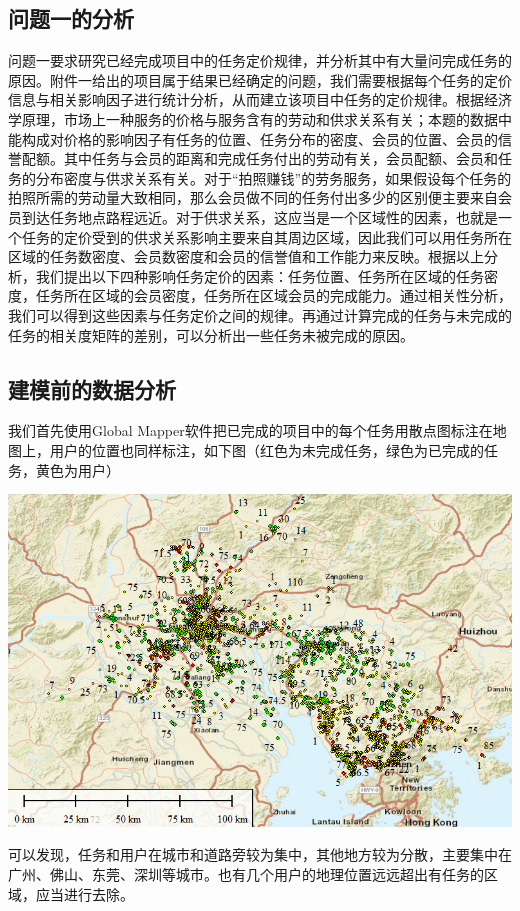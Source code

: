 \documentclass[withoutpreface,bwprint]{cumcmthesis} %
\begin{document}
\subsection{问题一的分析}
问题一要求研究已经完成项目中的任务定价规律，并分析其中有大量问完成任务的原因。附件一给出的项目属于结果已经确定的问题，我们需要根据每个任务的定价信息与相关影响因子进行统计分析，从而建立该项目中任务的定价规律。根据经济学原理，市场上一种服务的价格与服务含有的劳动和供求关系有关；本题的数据中能构成对价格的影响因子有任务的位置、任务分布的密度、会员的位置、会员的信誉配额。其中任务与会员的距离和完成任务付出的劳动有关，会员配额、会员和任务的分布密度与供求关系有关。对于“拍照赚钱”的劳务服务，如果假设每个任务的拍照所需的劳动量大致相同，那么会员做不同的任务付出多少的区别便主要来自会员到达任务地点路程远近。对于供求关系，这应当是一个区域性的因素，也就是一个任务的定价受到的供求关系影响主要来自其周边区域，因此我们可以用任务所在区域的任务数密度、会员数密度和会员的信誉值和工作能力来反映。根据以上分析，我们提出以下四种影响任务定价的因素：任务位置、任务所在区域的任务密度，任务所在区域的会员密度，任务所在区域会员的完成能力。通过相关性分析，我们可以得到这些因素与任务定价之间的规律。再通过计算完成的任务与未完成的任务的相关度矩阵的差别，可以分析出一些任务未被完成的原因。

\subsection{建模前的数据分析}
我们首先使用Global Mapper软件把已完成的项目中的每个任务用散点图标注在地图上，用户的位置也同样标注，如下图（红色为未完成任务，绿色为已完成的任务，黄色为用户）

\centerline{\includegraphics[width=15cm]{1.png}}
可以发现，任务和用户在城市和道路旁较为集中，其他地方较为分散，主要集中在广州、佛山、东莞、深圳等城市。也有几个用户的地理位置远远超出有任务的区域，应当进行去除。
\end{document}
